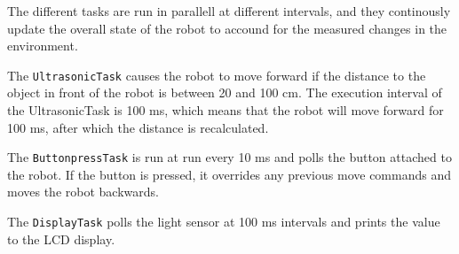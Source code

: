 \documentclass[a4paper,10pt]{report}
\begin{document}
The different tasks are run in parallell at different intervals, and they continously update the overall state of the robot to accound for the measured changes in the environment. 

The \texttt{UltrasonicTask} causes the robot to move forward if the distance to the object in front of the robot is between 20 and 100 cm. The execution interval of the UltrasonicTask is 100 ms, which means that the robot will move forward for 100 ms, after which the distance is recalculated.

The \texttt{ButtonpressTask} is run at run every 10 ms and polls the button attached to the robot. If the button is pressed, it overrides any previous move commands and moves the robot backwards.

The \texttt{DisplayTask} polls the light sensor at 100 ms intervals and prints the value to the LCD display.
\end{document}
